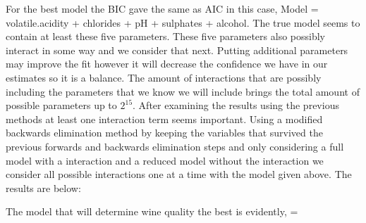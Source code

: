 \documentclass[]{article}
\begin{document}
For the best model the BIC gave the same as AIC in this case, Model = volatile.acidity + chlorides + pH + sulphates +  alcohol. The true model seems to contain at least these five parameters. These five parameters also possibly interact in some way and we consider that next. Putting additional parameters may improve the fit however it will decrease the confidence we have in our estimates so it is a balance. The amount of interactions that are possibly including the parameters that we know we will include brings the total amount of possible parameters up to $ 2^15 $. After examining  the results using the previous methods at least one interaction term seems important. Using a modified backwards elimination method by keeping the variables that survived the previous forwards and backwards elimination steps and only considering a full model with a interaction and a reduced model without the interaction we consider all possible interactions one at a time with the model given above. The results are below:
\begin{table}[H]
	\centering
\caption{All interactions of variables included in the model considered.}
\end{table}

The model that will determine wine quality the best is evidently,  =  \\ 
\end{document}
